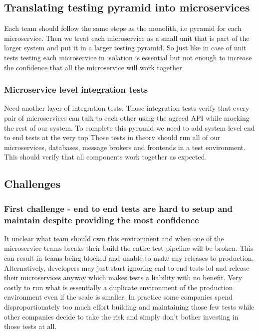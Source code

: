 \subsection{Translating testing pyramid into microservices}
Each team should follow the same steps as the monolith, i.e pyramid for each microservice.
Then we treat each microservice as a small unit that is part of the larger system and put it in a larger testing pyramid.
So just like in case of unit tests testing each microservice in isolation is essential but not enough to increase the confidence that all the microservice will work together

\subsubsection{Microservice level integration tests}
Need another layer of integration tests.
Those integration tests verify that every pair of microservices can talk to each other using the agreed API while mocking the rest of our system.
To complete this pyramid we need to add system level end to end tests at the very top
Those tests in theory should run all of our microservices, databases, message brokers and frontends in a test environment.
This should verify that all components work together as expected.

\subsection{Challenges}

\subsubsection{First challenge - end to end tests are hard to setup and maintain despite providing the most confidence}
It unclear what team should own this environment and when one of the microservice teams breaks their build the entire test pipeline will be broken.
This can result in teams being blocked and unable to make any releases to production.
Alternatively, developers may just start ignoring end to end tests lol and release their microservices anyway which makes tests a liability with no benefit.
Very costly to run what is essentially a duplicate environment of the production environment even if the scale is smaller.
In practice some companies spend disproportionately too much effort building and maintaining those few tests while other companies decide to take the risk and simply don't bother investing in those tests at all.

